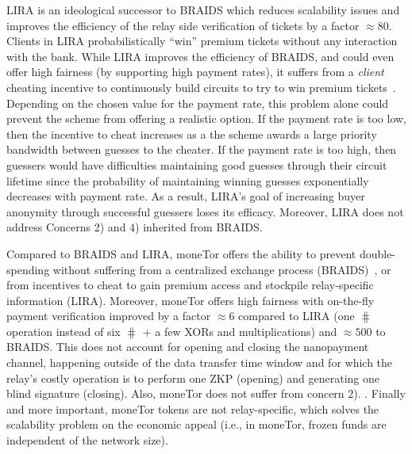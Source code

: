 LIRA is an ideological successor to BRAIDS which reduces scalability issues and
improves the efficiency of the relay side verification of tickets by a factor
$\approx 80$. Clients in LIRA probabilistically ``win'' premium tickets without
any interaction with the bank. While LIRA improves the efficiency of BRAIDS, and
could even offer high fairness (by supporting high payment rates), it suffers
from a \textit{client} cheating incentive to continuously build circuits to try
to win premium tickets~\cite{jansen2013lira, jansenblogpost}. Depending on the
chosen value for the payment rate, this problem alone could prevent the scheme
from offering a realistic option. If the payment rate is too low, then the
incentive to cheat increases as a the scheme awards a large priority bandwidth
between guesses to the cheater. If the payment rate is too high, then guessers
would have difficulties maintaining good guesses through their circuit lifetime
since the probability of maintaining winning guesses exponentially decreases
with payment rate. As a result, LIRA's goal of increasing buyer anonymity
through successful guessers loses its efficacy. Moreover, LIRA does not
address Concerns 2) and 4) inherited from BRAIDS.

Compared to BRAIDS and LIRA, moneTor offers the ability to prevent
double-spending without suffering from a centralized exchange process
(BRAIDS)~\cite{jansenblogpost}, or from incentives to cheat to gain premium
access and stockpile relay-specific information (LIRA). Moreover, moneTor offers
high fairness with on-the-fly payment verification improved by a factor $\approx
6$ compared to LIRA (one $\hash$ operation instead of six $\hash$ + a few XORs
and multiplications) and $\approx 500$ to BRAIDS. This does not account for
opening and closing the nanopayment channel, happening outside of the data
transfer time window and for which the relay's costly operation is to perform
one ZKP (opening) and generating one blind signature (closing). Also, moneTor
does not suffer from concern 2).%
.
  Finally and more important, moneTor tokens are not relay-specific, which
  solves the scalability problem on the economic appeal (i.e., in moneTor,
  frozen funds are independent of the network size).


